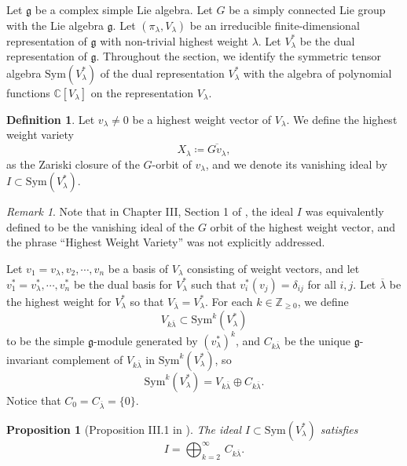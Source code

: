 \documentclass[12pt]{extarticle}
\theoremstyle{plain}
\newtheorem{prop}[theo]{Proposition}
\theoremstyle{definition}
\newtheorem{defi}[theo]{Definition}
\theoremstyle{remark}
\newtheorem{rema}[theo]{Remark}
\newcommand{\Lieg}{\mathfrak{g}}
\newcommand{\Sym}{\mathrm{Sym}}
\newcommand{\Z}{\mathbb{Z}}
\newcommand{\C}{\mathbb{C}}
\newcommand{\lambar}{{\overline{\lambda}}}
\begin{document}
Let $\Lieg$ be a complex simple Lie algebra. Let $G$ be a simply connected Lie group with the Lie algebra $\Lieg$. Let $(\pi_\lambda,V_\lambda)$ be an irreducible finite-dimensional representation of $\Lieg$ with non-trivial highest weight $\lambda$. 
Let $V^*_\lambda$ be the dual representation of $\Lieg$. Throughout the section, we identify the symmetric tensor algebra $\Sym(V_\lambda^*)$ of the dual representation $V^*_\lambda$ with the algebra of polynomial functions $\C[V_\lambda]$ on the representation $V_\lambda$.
\begin{defi}
	 Let $v_\lambda\neq0$ be a highest weight vector of $V_\lambda$. We define the highest weight variety 
	$$
	X_\lambda\coloneqq\overline{G v_\lambda},
	$$
    as the Zariski closure of the $G$-orbit of $v_\lambda$,
	and we denote its vanishing ideal by $I\subset\Sym(V_\lambda^*)$.
\end{defi}
\begin{rema} 
    Note that in Chapter III, Section 1 of \cite{Garfinkle}, the ideal $I$ was equivalently defined to be the vanishing ideal of the $G$ orbit of the highest weight vector, and the phrase ``Highest Weight Variety'' was not explicitly addressed.
\end{rema}
Let $v_1=v_\lambda,v_2,\cdots,v_n$ be a basis of $V_\lambda$ consisting of weight vectors, and let $v^*_1=v^*_\lambda,\cdots,v^*_n$ be the dual basis for $V^*_\lambda$ such that $v^*_i(v_j)=\delta_{ij}$ for all $i,j$. Let $\lambar$ be the highest weight for $V^*_\lambda$ so that $V_\lambar= V^*_\lambda$.
For each $k\in\Z_{\geq0}$, we define $$V_{k\overline{\lambda}}\subset \Sym^k(V_\lambda^*)$$ to be the simple $\Lieg$-module generated by $(v^*_\lambda)^k$, and $C_{k\lambar}$ be the unique $\Lieg$-invariant complement of $V_{k\lambar}$ in $\Sym^k(V_\lambda^*)$, so
	$$\Sym^k(V_\lambda^*)=V_{k\lambar}\oplus C_{k\lambar}.$$
Notice that $C_0=C_\lambar=\{0\}$.
\begin{prop}[Proposition III.1 in \cite{Garfinkle}]\label{prop1} The ideal $I\subset\Sym(V_\lambda^*)$ satisfies
	$$I=\bigoplus_{k=2}^{\infty}\,C_{k\lambar}.$$
\end{prop}
\end{document}
